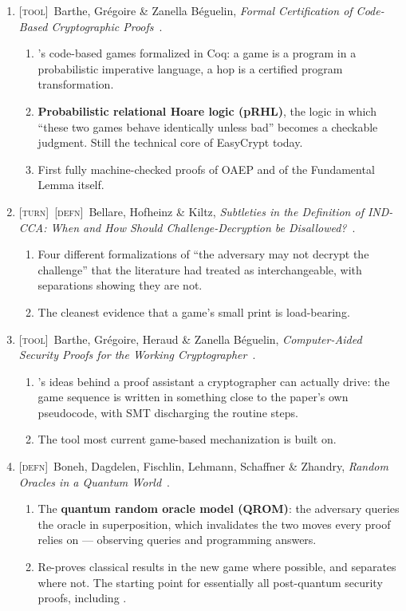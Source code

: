 \documentclass[11pt]{article}
\newcommand{\kind}[1]{{\footnotesize\textsc{\textcolor{yearcolor}{[#1]}}}\ }
\newcommand{\defn}{\kind{defn}}
\newcommand{\tool}{\kind{tool}}
\newcommand{\turn}{\kind{turn}}
\newcommand{\paper}[3]{#1, \emph{#2}~\cite{#3}.}
\begin{document}
\begin{enumerate}
  \item \tool \paper{Barthe, Grégoire \& Zanella Béguelin}{Formal Certification
    of Code-Based Cryptographic Proofs}{CertiCrypt09}
    \begin{enumerate}
      \item \cite{BR04}'s code-based games formalized in Coq: a game is a
        program in a probabilistic imperative language, a hop is a certified
        program transformation.
      \item \textbf{Probabilistic relational Hoare logic (pRHL)}, the logic in
        which ``these two games behave identically unless bad'' becomes a
        checkable judgment. Still the technical core of EasyCrypt today.
      \item First fully machine-checked proofs of OAEP and of the Fundamental
        Lemma itself.
    \end{enumerate}

  \item \turn\defn \paper{Bellare, Hofheinz \& Kiltz}{Subtleties in the
    Definition of IND-CCA: When and How Should Challenge-Decryption be
    Disallowed?}{BHK09}
    \begin{enumerate}
      \item Four different formalizations of ``the adversary may not decrypt the
        challenge'' that the literature had treated as interchangeable, with
        separations showing they are not.
      \item The cleanest evidence that a game's small print is load-bearing.
    \end{enumerate}

  \item \tool \paper{Barthe, Grégoire, Heraud \& Zanella Béguelin}{Computer-Aided
    Security Proofs for the Working Cryptographer}{EasyCrypt11}
    \begin{enumerate}
      \item \cite{CertiCrypt09}'s ideas behind a proof assistant a cryptographer
        can actually drive: the game sequence is written in something close to
        the paper's own pseudocode, with SMT discharging the routine steps.
      \item The tool most current game-based mechanization is built on.
    \end{enumerate}

  \item \defn \paper{Boneh, Dagdelen, Fischlin, Lehmann, Schaffner \& Zhandry}
    {Random Oracles in a Quantum World}{QROM11}
    \begin{enumerate}
      \item The \textbf{quantum random oracle model (QROM)}: the adversary
        queries the oracle in superposition, which invalidates the two moves
        every \cite{BR93rom} proof relies on --- observing queries and
        programming answers.
      \item Re-proves classical results in the new game where possible, and
        separates where not. The starting point for essentially all post-quantum
        security proofs, including \cite{HHK17}.
    \end{enumerate}


\end{enumerate}
\end{document}
